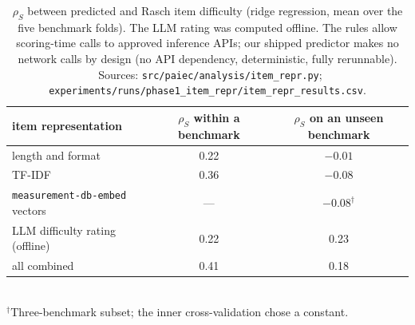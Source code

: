 \documentclass{article}
\newcommand{\rs}{\ensuremath{\rho_S}}
\newcommand{\src}[1]{{\footnotesize\ Sources: #1.}}
\newcommand{\p}[1]{\nolinkurl{#1}}
\begin{document}
\begin{table}[h]
  \caption{\rs{} between predicted and Rasch item difficulty (ridge regression, mean over the five benchmark folds).
  The LLM rating was computed offline. The rules allow scoring-time calls to approved inference APIs; our shipped
  predictor makes no network calls by design (no API dependency, deterministic, fully rerunnable). \src{\p{src/paiec/analysis/item_repr.py}; \p{experiments/runs/phase1_item_repr/item_repr_results.csv}}}
  \label{tab:repr}
  \centering\small
  \begin{tabular}{lcc}
    \toprule
    item representation & \rs{} within a benchmark & \rs{} on an unseen benchmark\\
    \midrule
    length and format                        & 0.22 & $-0.01$\\
    TF-IDF                                   & 0.36 & $-0.08$\\
    \texttt{measurement-db-embed} vectors    & ---  & $-0.08^{\dagger}$\\
    LLM difficulty rating (offline)          & 0.22 & \phantom{$-$}0.23\\
    all combined                             & 0.41 & \phantom{$-$}0.18\\
    \bottomrule
  \end{tabular}\\[2pt]
  {\footnotesize $^{\dagger}$Three-benchmark subset; the inner cross-validation chose a constant.}
\end{table}
\end{document}
